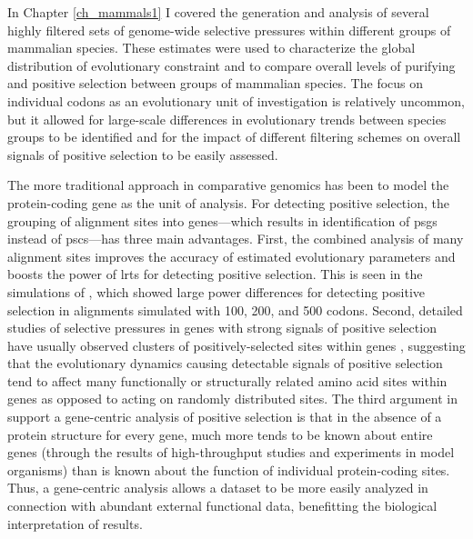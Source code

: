 In Chapter \ref{ch_mammals1} I covered the generation and analysis of
several highly filtered sets of genome-wide \sw selective pressures
within different groups of mammalian species. These \sw estimates were
used to characterize the global distribution of evolutionary
constraint and to compare overall levels of purifying and positive
selection between groups of mammalian species. The focus on individual
codons as an evolutionary unit of investigation is relatively
uncommon, but it allowed for large-scale differences in evolutionary
trends between species groups to be identified and for the impact of
different filtering schemes on overall signals of positive selection
to be easily assessed.

The more traditional approach in comparative genomics has been to
model the protein-coding gene as the unit of analysis. For detecting
positive selection, the grouping of alignment sites into genes---which
results in identification of \acp{psg} instead of \acp{psc}---has
three main advantages. First, the combined analysis of many alignment
sites improves the accuracy of estimated evolutionary parameters and
boosts the power of \acp{lrt} for detecting positive selection. This
is seen in the simulations of \citet{Anisimova2001,Anisimova2002},
which showed large power differences for detecting positive selection
in alignments simulated with 100, 200, and 500 codons. Second,
detailed studies of \sw selective pressures in genes with strong
signals of positive selection have usually observed clusters of
positively-selected sites within genes \citep{Sawyer2005a,Kosiol2008},
suggesting that the evolutionary dynamics causing detectable signals
of positive selection tend to affect many functionally or structurally
related amino acid sites within genes as opposed to acting on randomly
distributed sites. The third argument in support a gene-centric
analysis of positive selection is that in the absence of a protein
structure for every gene, much more tends to be known about entire
genes (through the results of high-throughput studies and experiments
in model organisms) than is known about the function of individual
protein-coding sites. Thus, a gene-centric analysis allows a dataset
to be more easily analyzed in connection with abundant external
functional data, benefitting the biological interpretation of results.

